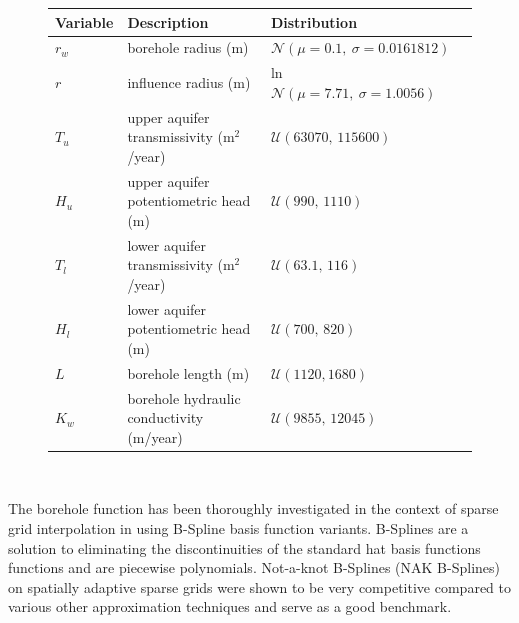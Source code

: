 \documentclass[
  a4paper,  %
  twoside,  %
  bibliography=totoc,
  headsepline,
  cleardoublepage=empty,
  parskip=half,
  draft=false
]{scrbook}
\begin{document}
\begin{mdframed}[style=style]
\begin{figure}[H]
\centering
\bgroup
\def\arraystretch{1.2}%
  \begin{tabular}{ l l l l}
Variable & Description & Distribution\\
\hline
$r_w$ & borehole radius (m) & $\mathcal{N}(\mu=0.1, ~\sigma=0.0161812)$\\
$r$ & influence radius (m) & ln $\mathcal{N}(\mu=7.71, ~\sigma=1.0056)$\\
$T_u$ & upper aquifer transmissivity (m$^2$/year) & $\mathcal{U}(63070,\, 115600)$\\
$H_u$ & upper aquifer potentiometric head (m) & $\mathcal{U}(990,\,  1110)$\\
$T_l$ & lower aquifer transmissivity (m$^2$/year) & $\mathcal{U}(63.1,\, 116)$\\
$H_l$ & lower aquifer potentiometric head (m) & $\mathcal{U}(700, \, 820)$\\
$L$ & borehole length (m) & $\mathcal{U}(1120, 1680)$\\
$K_w$ & borehole hydraulic conductivity (m/year) & $\mathcal{U}(9855, \, 12045)$\\
\end{tabular}
\egroup\\
\vspace{0.5em}
\delimit
{}
\label{tab:borehole_params}
\end{figure}
\end{mdframed}

The borehole function has been thoroughly investigated in the context of sparse grid interpolation in \cite{} using B-Spline basis function variants.
B-Splines are a solution to eliminating the discontinuities of the standard hat basis functions functions and are piecewise polynomials.
Not-a-knot B-Splines (NAK B-Splines) on spatially adaptive sparse grids were shown to be very competitive compared to various other approximation techniques and serve as a good benchmark.
\end{document}

